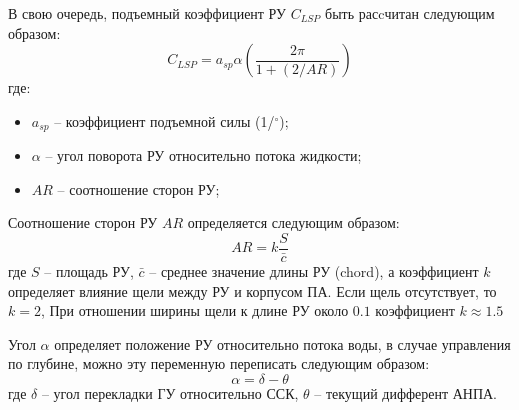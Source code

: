 В свою очередь, подъемный коэффициент РУ $C_{LSP}$ быть расcчитан следующим образом:
\begin{equation}
    C_{LSP} = a_{sp}\alpha \left( \frac{2 \pi}{1 + (2/AR)} \right)
\end{equation}
\noindent где:
\begin{itemize}
    \item $a_{sp}$ -- коэффициент подъемной силы (1/$^\circ$);
    \item $\alpha$ -- угол поворота РУ относительно потока жидкости;
    \item $AR$ -- соотношение сторон РУ;
\end{itemize}

Соотношение сторон РУ $AR$ определяется следующим образом:
\begin{equation}
    AR = k \frac{S}{\bar{c}}
\end{equation}
\noindent где $S$ -- площадь РУ, $\bar{c}$ -- среднее значение длины РУ (chord), а коэффициент $k$ определяет влияние щели между РУ и корпусом ПА. Если щель отсутствует, то $k=2$, При отношении ширины щели к длине РУ около $0.1$ коэффициент $k\approx1.5$

Угол $\alpha$ определяет положение РУ относительно потока воды, в случае управления по глубине, можно эту переменную переписать следующим образом:
\begin{equation}
    \alpha = \delta - \theta
\end{equation}
\noindent где $\delta$ -- угол перекладки ГУ относительно ССК, $\theta$ -- текущий дифферент АНПА.

